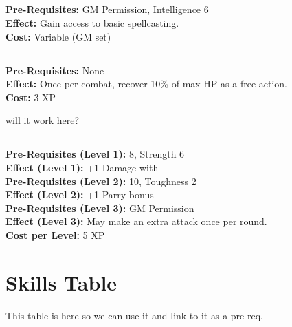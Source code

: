 \documentclass[12pt]{article}
\begin{document}
\begin{multicols}{2}
\medskip

\subsection*{}
\textbf{Pre-Requisites:} GM Permission, Intelligence 6\\
\textbf{Effect:} Gain access to basic spellcasting.\\
\textbf{Cost:} Variable (GM set)

\medskip

\subsection*{}
\textbf{Pre-Requisites:} None\\
\textbf{Effect:} Once per combat, recover 10\% of max HP as a free action.\\
\textbf{Cost:} 3 XP

\medskip

will it work here?

\subsection*{}
\textbf{Pre-Requisites (Level 1):}  8, Strength 6\\
\textbf{Effect (Level 1):} +1 Damage with \\[0.25em]
\textbf{Pre-Requisites (Level 2):}  10, Toughness 2\\
\textbf{Effect (Level 2):} +1 Parry bonus\\[0.25em]
\textbf{Pre-Requisites (Level 3):} GM Permission\\
\textbf{Effect (Level 3):} May make an extra attack once per round.\\
\textbf{Cost per Level:} 5 XP

\end{multicols}
\newpage

\section{Skills Table}

This table is here so we can use it and link to it as a pre-req.
\end{document}
